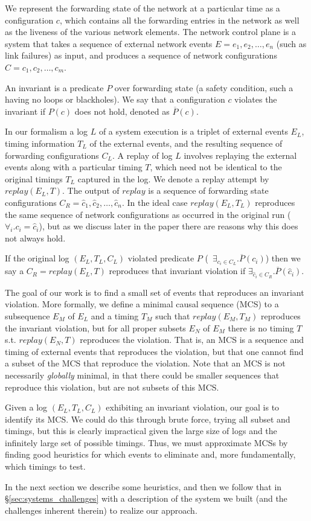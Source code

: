 We represent the forwarding state of the network
at a particular time as a configuration $c$, which contains all the forwarding
entries in the network
as well as the liveness of the various network elements.
The network control plane is a system that takes a sequence of
external network events $E = e_1,e_2,\dots,e_n$ (such as link failures) as input,
and produces a sequence of network configurations
$C = c_1,c_2,\dots,c_m$.

An invariant is a predicate $P$ over forwarding state (a safety
condition, such a having no loops or blackholes). We say that a configuration
$c$ violates the invariant if $P(c)$ does not
hold, denoted as $\overline{P}(c)$.

In our formalism a log $L$ of a system execution is a triplet of external events $E_L$,
timing information $T_L$ of the external events, and the resulting sequence of forwarding
configurations $C_L$.
A replay of log $L$ involves replaying the external events along with a
particular timing $T$,
which need not be identical to the original timings $T_L$ captured in the log.
We denote a replay attempt by $replay(E_L,T)$.
The output of $replay$ is a sequence of forwarding state configurations
$C_R = \hat{c}_1,\hat{c}_2,\dots,\hat{c}_n$. In the ideal case $replay(E_L,T_L)$ reproduces the same
sequence of network configurations as occurred in the original run
(\ie~$\forall_i. c_i = \hat{c}_i$), but as we discuss later in the paper there are reasons why
this does not always hold.

If the original log $(E_L, T_L, C_L)$ violated predicate $P$
(\ie~$\exists_{c_i \in C_L}. \overline{P}(c_i)$)
then we say a $C_R = replay(E_L,T)$ reproduces that invariant violation if
$\exists_{\hat{c}_i \in C_R}. \overline{P}(\hat{c}_i)$.

The goal of our work is to find a small set of events that reproduces an invariant violation.  More formally, we define a minimal causal sequence (MCS) to a subsequence $E_M$
of $E_L$ and a timing $T_M$ such
that $replay(E_M,T_M)$ reproduces the invariant violation, but for all proper
subsets $E_N$ of $E_M$
there is no timing $T$ s.t. $replay(E_N,T)$ reproduces the violation. That is, an MCS is a sequence and timing of external events that reproduces the violation, but that one cannot find a subset of the MCS that reproduce the violation.  Note that an MCS is not necessarily {\em globally} minimal, in that there could be smaller sequences that reproduce this violation, but are not subsets of this MCS.

Given a log $(E_L, T_L, C_L)$ exhibiting an invariant violation,
our goal is to identify its MCS. We could do this through brute force, trying all subset and timings, but this is clearly impractical given the large size of logs and the infinitely large set of possible timings. Thus, we must approximate MCSs by finding good heuristics for which events to eliminate and, more fundamentally, which timings to test.

In the next section we describe some heuristics, and then we follow that in \S\ref{sec:systems_challenges} with a description of the system we built (and the challenges inherent therein) to realize our approach.

